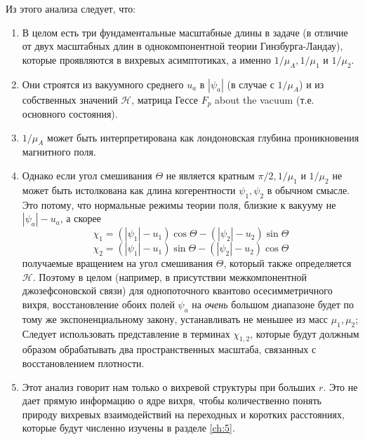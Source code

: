 Из этого анализа следует, что:
\begin{enumerate}
    \item В целом есть три фундаментальные масштабные длины в задаче (в 
        отличие от двух масштабных длин в однокомпонентной теории 
        Гинзбурга-Ландау), которые проявляются в вихревых асимптотиках, а 
        именно \( 1/\mu_A, 1/\mu_1 \) и \( 1/\mu_2 \).
    \item Они строятся из вакуумного среднего \( u_a \) в \( |\psi_a| \) 
        (в случае с \( 1/\mu_A \)) и из собственных значений 
        \( \mathcal{H} \), матрица Гессе \( F_p \) about the vacuum (т.е. 
        основного состояния).
    \item \( 1/\mu_{A} \) может быть интерпретирована как лондоновская глубина 
        проникновения магнитного поля.
    \item Однако если угол смешивания \( \Theta \) не является кратным  
        \( \pi/2, 1/\mu_1 \) и \( 1/\mu_2 \) не может быть истолкована как 
        длина когерентности \( \psi_1, \psi_2 \) в обычном смысле. Это потому, 
        что нормальные режимы теории поля, близкие к вакууму не 
        \( |\psi_a| - u_a \), а скорее
        \[ 
            \chi_1 = (|\psi_1| - u_1)\cos\Theta - (|\psi_2| - u_2)\sin\Theta 
        \]
        \[ 
            \chi_2 = (|\psi_1| - u_1)\sin\Theta - (|\psi_2| - u_2)\cos\Theta 
        \]
        получаемые вращением на угол смешивания \( \Theta \), который также 
        определяется \( \mathcal{H} \). Поэтому в целом (например, в 
        присутствии межкомпонентной джозефсоновской связи) для однопоточного
        квантово осесимметричного вихря, восстановление обоих полей
        \( \psi_a \) на \textit{очень} большом диапазоне будет по тому же 
        экспоненциальному закону, устанавливать не меньшее из масс 
        \( \mu_1, \mu_2 \); Следует использовать представление в терминах 
        \( \chi_{1,2} \), которые будут должным образом обрабатывать два 
        пространственных масштаба, связанных с восстановлением плотности.
    \item Этот анализ говорит нам только о вихревой структуры при больших
        \( r \). Это не дает прямую информацию о ядре вихря, чтобы 
        количественно понять природу вихревых взаимодействий на переходных 
        и коротких расстояниях, которые будут численно изучены в разделе 
        \ref{ch:5}.
\end{enumerate}


